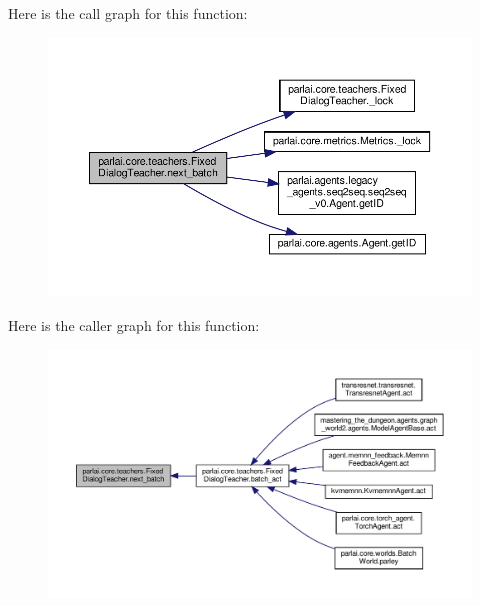 Here is the call graph for this function\+:
\nopagebreak
\begin{figure}[H]
\begin{center}
\leavevmode
\includegraphics[width=350pt]{classparlai_1_1core_1_1teachers_1_1FixedDialogTeacher_a49100faf9af79c6e24ddac9e36151d54_cgraph}
\end{center}
\end{figure}
Here is the caller graph for this function\+:
\nopagebreak
\begin{figure}[H]
\begin{center}
\leavevmode
\includegraphics[width=350pt]{classparlai_1_1core_1_1teachers_1_1FixedDialogTeacher_a49100faf9af79c6e24ddac9e36151d54_icgraph}
\end{center}
\end{figure}
\mbox{\label{classparlai_1_1core_1_1teachers_1_1FixedDialogTeacher_a7fccfc09aef3510f8bb9834398eff8e9}} 
